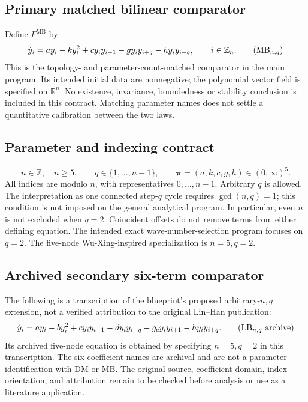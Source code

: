 \documentclass[11pt]{article}
\newcommand{\R}{\mathbb{R}}
\newcommand{\Z}{\mathbb{Z}}
\newcommand{\Zn}{\mathbb{Z}_n}
\newcommand{\DM}{\mathrm{DM}}
\newcommand{\MB}{\mathrm{MB}}
\newcommand{\LB}{\mathrm{LB}}
\newcommand{\param}{\boldsymbol{\pi}}
\theoremstyle{definition}
\theoremstyle{remark}
\begin{document}
\subsection{Primary matched bilinear comparator}
Define $F^{\MB}$ by
\begin{equation}
\label{eq:canonical-mb}
\dot{y}_i=a y_i-k y_i^2+c y_i y_{i-1}
                 -g y_i y_{i+q}-h y_i y_{i-q},\qquad i\in\Zn.
\tag{$\MB_{n,q}$}
\end{equation}
This is the topology- and parameter-count-matched comparator in the main
program. Its intended initial data are nonnegative; the polynomial vector
field is specified on $\R^n$. No existence, invariance, boundedness or
stability conclusion is included in this contract. Matching parameter names
does not settle a quantitative calibration between the two laws.

\subsection{Parameter and indexing contract}
\[
n\in\Z,\quad n\geq5,\qquad q\in\{1,\ldots,n-1\},\qquad
\param=(a,k,c,g,h)\in(0,\infty)^5.
\]
All indices are modulo $n$, with representatives $0,\ldots,n-1$.
Arbitrary $q$ is allowed. The interpretation as one connected step-$q$ cycle
requires $\gcd(n,q)=1$; this condition is not imposed on the general analytical
program. In particular, even $n$ is not excluded when $q=2$. Coincident offsets
do not remove terms from either defining equation.
The intended exact wave-number-selection program focuses on $q=2$.
The five-node Wu-Xing-inspired specialization is $n=5,q=2$.

\subsection{Archived secondary six-term comparator}
The following is a transcription of the blueprint's proposed arbitrary-$n,q$
extension, not a verified attribution to the original Lin--Han publication:
\begin{equation}
\label{eq:archived-lb}
\dot{y}_i=a y_i-b y_i^2+c y_i y_{i-1}-d y_i y_{i-q}
                    -g_{\mathrm c}y_i y_{i+1}-h y_i y_{i+q}.
\tag{$\LB_{n,q}$ archive}
\end{equation}
Its archived five-node equation is obtained by specifying $n=5,q=2$ in this
transcription. The six coefficient names are archival and are not a parameter
identification with $\DM$ or $\MB$. The original source, coefficient domain,
index orientation, and attribution remain to be checked before analysis or
use as a literature application.
\end{document}
